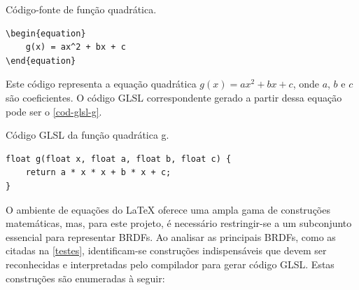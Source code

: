\begin{codigo}[H]
\caption{\small Código-fonte de função quadrática.}
\label{equation-latex}
\begin{lstlisting}
\begin{equation}
    g(x) = ax^2 + bx + c
\end{equation}
\end{lstlisting}
\end{codigo}




Este código representa a equação quadrática \( g(x) = ax^2 + bx + c \), onde \( a \), \( b \) e \( c \) são coeficientes. O código GLSL correspondente gerado a partir dessa equação pode ser o \autoref{cod-glsl-g}.

\begin{codigo}[H]
\caption{\small Código GLSL da função quadrática g.}
\label{cod-glsl-g}
\begin{lstlisting}
float g(float x, float a, float b, float c) {
    return a * x * x + b * x + c;
}
\end{lstlisting}
\end{codigo}

O ambiente de equações do \LaTeX{} oferece uma ampla gama de construções matemáticas, mas, para este projeto, é necessário restringir-se a um subconjunto essencial para representar BRDFs. Ao analisar as principais BRDFs, como as citadas na \autoref{testes}, identificam-se construções indispensáveis que devem ser reconhecidas e interpretadas pelo compilador para gerar código GLSL. Estas construções são enumeradas à seguir:

